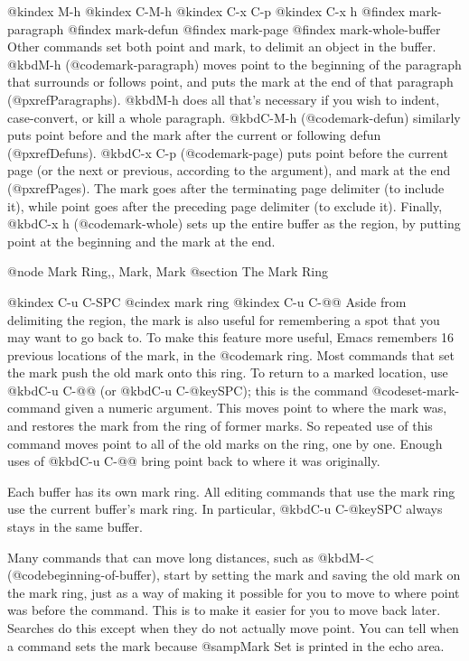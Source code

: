 {{{{{{@kindex M-h
@kindex C-M-h
@kindex C-x C-p
@kindex C-x h
@findex mark-paragraph
@findex mark-defun
@findex mark-page
@findex mark-whole-buffer
   Other commands set both point and mark, to delimit an object in the
buffer.  @kbd{M-h} (@code{mark-paragraph}) moves point to the beginning of
the paragraph that surrounds or follows point, and puts the mark at the end
of that paragraph (@pxref{Paragraphs}).  @kbd{M-h} does all that's
necessary if you wish to indent, case-convert, or kill a whole paragraph.
@kbd{C-M-h} (@code{mark-defun}) similarly puts point before and the mark
after the current or following defun (@pxref{Defuns}).  @kbd{C-x C-p}
(@code{mark-page}) puts point before the current page (or the next or
previous, according to the argument), and mark at the end (@pxref{Pages}).
The mark goes after the terminating page delimiter (to include it), while
point goes after the preceding page delimiter (to exclude it).  Finally,
@kbd{C-x h} (@code{mark-whole}) sets up the entire buffer as the region, by
putting point at the beginning and the mark at the end.

@node Mark Ring,, Mark, Mark
@section The Mark Ring

@kindex C-u C-SPC
@cindex mark ring
@kindex C-u C-@@
  Aside from delimiting the region, the mark is also useful for remembering
a spot that you may want to go back to.  To make this feature more useful,
Emacs remembers 16 previous locations of the mark, in the @code{mark ring}.
Most commands that set the mark push the old mark onto this ring.  To
return to a marked location, use @kbd{C-u C-@@} (or @kbd{C-u C-@key{SPC}});
this is the command @code{set-mark-command} given a numeric argument.  This
moves point to where the mark was, and restores the mark from the ring of
former marks.  So repeated use of this command moves point to all of the
old marks on the ring, one by one.  Enough uses of @kbd{C-u C-@@} bring
point back to where it was originally.

  Each buffer has its own mark ring.  All editing commands that use the
mark ring use the current buffer's mark ring.  In particular, @kbd{C-u
C-@key{SPC}} always stays in the same buffer.

  Many commands that can move long distances, such as @kbd{M-<}
(@code{beginning-of-buffer}), start by setting the mark and saving the old
mark on the mark ring, just as a way of making it possible for you to move
to where point was before the command.  This is to make it easier for you
to move back later.  Searches do this except when they do not actually move
point.  You can tell when a command sets the mark because @samp{Mark Set}
is printed in the echo area.

}}}}}}
